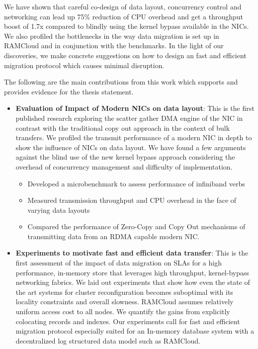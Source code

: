 We have shown that careful co-design of data layout, concurrency control
and networking can lead up 75\% reduction of CPU overhead and  get a throughput
boost of 1.7x compared to blindly using the kernel bypass available
in the NICs. We also profiled the bottlenecks in the way data migration is set up
in RAMCloud and in conjunction with the benchmarks. In the light of our discoveries,
we make concrete suggestions on how to design an fast and efficient migration 
protocol which causes minimal disruption.

The following are the main contributions from this work which supports and provides
evidence for the thesis statement.

\begin{itemize}

\item{\textbf{Evaluation of Impact of Modern NICs on data layout}}: This is the first published research exploring the scatter gather DMA engine of the NIC in contrast with the traditional copy out approach in the context of bulk transfers. 
 We profiled the transmit performance of a modern NIC in depth to show the influence of NICs on data layout. 
 We have found a few arguments against the blind use of the new kernel bypass approach considering
 the overhead of concurrency management and difficulty of implementation.
\begin{itemize}

\item Developed a microbenchmark to assess performance of infiniband verbs

\item Measured transmission throughput and CPU overhead in the face of varying
data layouts

\item Compared the performance of Zero-Copy and Copy Out mechanisms of 
transmitting data from an RDMA capable modern NIC.

\end{itemize} 


\item{\textbf{Experiments to motivate fast and efficient data transfer}}: This is the first assessment of the impact of data migration on SLAs for a high performance,
  in-memory store that leverages high throughput, kernel-bypass networking fabrics. 
We laid out experiments that show how even the state of the art systems for cluster reconfiguration becomes suboptimal with its locality constraints and overall slowness. 
 RAMCloud assumes relatively uniform access cost to all nodes.
 We quantify the gains from explicitly colocating records and indexes.
 Our experiments call for fast and efficient migration protocol especially suited for an In-memory database system with a decentralized log structured data model such as RAMCloud.


\end{itemize}

